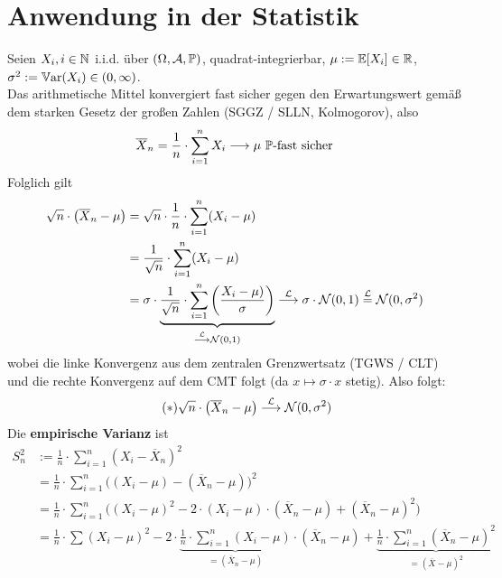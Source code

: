 \section*{Anwendung in der Statistik}
Seien $X_i,i\in\N$ i.i.d. über $(\Omega,\A,\P)$, quadrat-integrierbar, $\mu:=\E[X_i]\in\R$,\\ $\sigma^2:=\Var(X_i)\in(0,\infty)$.\\ Das arithmetische Mittel konvergiert fast sicher gegen den Erwartungswert gemäß dem starken Gesetz der großen Zahlen (SGGZ / SLLN, Kolmogorov), also
\begin{align*}
\overline{X}_n=\frac{1}{n}\cdot\sum\limits_{i=1}^n X_i\stackrel{}{\longrightarrow}\mu~\P\text{-fast sicher}
\end{align*}
Folglich gilt
\begin{equation}
\label{eqAnwendungInDerStatistik}
\begin{aligned}
\sqrt{n}\cdot\big(\overline{X}_n-\mu\big)
&=\sqrt{n}\cdot\frac{1}{n}\cdot\sum\limits_{i=1}^n(X_i-\mu)\\
&=\frac{1}{\sqrt{n}}\cdot\sum\limits_{i=1}^n(X_i-\mu)\\
&=\sigma\cdot\underbrace{\frac{1}{\sqrt{n}}\cdot\sum\limits_{i=1}^n\left(\frac{X_i-\mu)}{\sigma}\right)}_{\stackrel{\L}{\longrightarrow}\mathcal{N}(0,1)}\stackrel{\L}{\longrightarrow}\sigma\cdot\mathcal{N}(0,1)\stackeq{\L}\mathcal{N}(0,\sigma^2)
\end{aligned}
\end{equation}
wobei die linke Konvergenz aus dem zentralen Grenzwertsatz (TGWS / CLT) und die rechte Konvergenz auf dem CMT folgt (da $x\mapsto\sigma\cdot x$ stetig). Also folgt:
\begin{align}\label{eqAnwendungInDerStatistikStern}\tag{$\ast$}
\sqrt{n}\cdot\big(\overline{X}_n-\mu\big)\stackrel{\L}{\longrightarrow}\mathcal{N}(0,\sigma^2)
\end{align}
Die \textbf{empirische Varianz} ist 
\begin{align*}
S_n^2&:=\frac{1}{n}\cdot\sum\limits_{i=1}^n(X_i-\overline{X}_n)^2\\
&=\frac{1}{n}\cdot\sum\limits_{i=1}^n\big((X_i-\mu)-(\overline{X}_n-\mu)\big)^2\\
&=\frac{1}{n}\cdot\sum\limits_{i=1}^n\Big((X_i-\mu)^2-2\cdot(X_i-\mu)\cdot(\overline{X}_n-\mu)+(\overline{X}_n-\mu)^2\Big)\\
&=\frac{1}{n}\cdot\sum\limits(X_i-\mu)^2-2\cdot\underbrace{\frac{1}{n}\cdot\sum\limits_{i=1}^n(X_i-\mu)}_{=(\overline{X}_n-\mu)}\cdot(\overline{X}_n-\mu)+\underbrace{\frac{1}{n}\cdot\sum\limits_{i=1}^n(\overline{X}_n-\mu)^2}_{=(\overline{X}-\mu)^2}\\
\end{align*}
